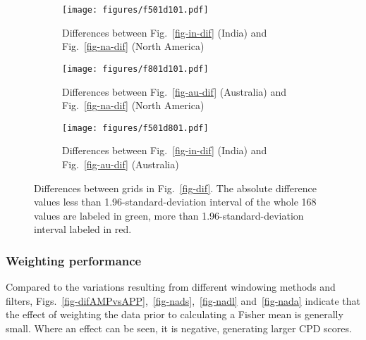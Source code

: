 \begin{figure*}
	\centering
	\begin{subfigure}{1.01\textwidth}
		\texttt{[image: figures/f501d101.pdf]}
		\caption{Differences between Fig.~\ref{fig-in-dif} (India) and
		Fig.~\ref{fig-na-dif} (North America)}\label{fig-i-n-dif}
	\end{subfigure}
	\vspace{.1em}
	\begin{subfigure}{1.01\textwidth}
		\texttt{[image: figures/f801d101.pdf]}
		\caption{Differences between Fig.~\ref{fig-au-dif} (Australia) and
		Fig.~\ref{fig-na-dif} (North America)}\label{fig-a-n-dif}
	\end{subfigure}
	\vspace{.1em}
	\begin{subfigure}{1.01\textwidth}
		\texttt{[image: figures/f501d801.pdf]}
		\caption{Differences between Fig.~\ref{fig-in-dif} (India) and
		Fig.~\ref{fig-au-dif} (Australia)}\label{fig-i-a-dif}
	\end{subfigure}
	\caption[Differences of differences of each plate's paleomagnetic
APWPs versus its FHM predicted APWP]{Differences between grids in
Fig.~\ref{fig-dif}. The absolute difference values less than
1.96-standard-deviation interval of the whole 168 values are labeled in green,
more than 1.96-standard-deviation interval labeled in red.}\label{fig-d-dif}
\end{figure*}

\subsubsection{Weighting performance}

Compared to the variations resulting from different windowing methods and
filters, Figs.~\ref{fig-difAMPvsAPP},~\ref{fig-nads},~\ref{fig-nadl}
and~\ref{fig-nada} indicate that the effect of weighting the data prior to
calculating a Fisher mean is generally small. Where an effect can be seen, it is
negative, generating larger CPD scores.

